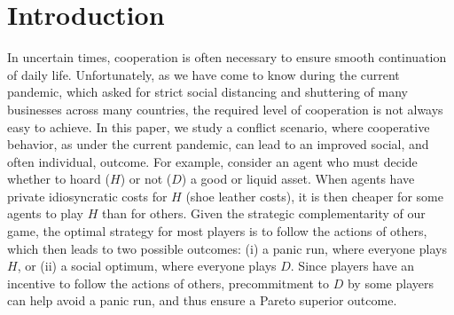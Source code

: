 \documentclass[12pt,english]{article}
\begin{document}


\section{Introduction} 
In uncertain times, cooperation is often necessary to ensure smooth continuation of daily life. Unfortunately, as we have come to know during the current pandemic, which asked for strict social distancing and shuttering of many businesses across many countries, the required level of cooperation is not always easy to achieve. In this paper, we study a conflict scenario, where cooperative behavior, as under the current pandemic, can lead to an improved social, and often individual, outcome. For example, consider an agent who must decide whether to hoard ($H$) or not ($D$) a good or liquid asset. When agents have private idiosyncratic costs for $H$ (shoe leather costs), it is then cheaper for some agents to play $H$ than for others. Given the strategic complementarity of our game, the optimal strategy for most players is to follow the actions of others, which then leads to two possible outcomes: (i) a panic run, where everyone plays $H$, or (ii) a social optimum, where everyone plays $D$. Since players have an incentive to follow the actions of others, precommitment to $D$ by some players can help avoid a panic run, and thus ensure a Pareto superior outcome. 

\end{document}
